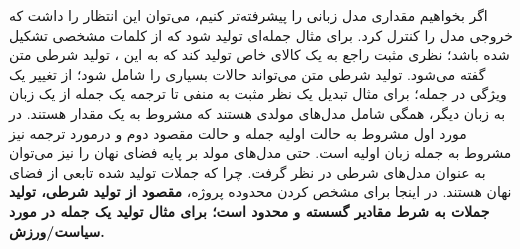 اگر بخواهیم مقداری \task{} مدل زبانی را پیشرفته‌تر کنیم، می‌توان این انتظار را داشت که خروجی مدل را کنترل کرد. برای مثال جمله‌ای تولید شود که از کلمات مشخصی تشکیل شده باشد؛ نظری مثبت راجع به یک کالای خاص تولید کند که به این \task{}، تولید شرطی متن گفته می‌شود. تولید شرطی متن می‌تواند حالات بسیاری را شامل شود؛ از تغییر یک ویژگی در جمله؛ برای مثال تبدیل یک نظر مثبت به منفی تا ترجمه یک جمله از یک زبان به زبان دیگر، همگی شامل مدل‌های مولدی هستند که مشروط به یک مقدار هستند. در مورد اول مشروط به حالت اولیه جمله و حالت مقصود دوم و درمورد ترجمه نیز مشروط به جمله زبان اولیه است. حتی مدل‌های  مولد بر پایه فضای نهان را نیز می‌توان به عنوان مدل‌های شرطی در نظر گرفت. چرا که جملات تولید شده تابعی از فضای نهان هستند. در اینجا برای مشخص کردن محدوده پروژه، 
{\bf
    مقصود از تولید شرطی، تولید جملات به شرط مقادیر گسسته و محدود است؛ برای مثال تولید یک جمله در مورد سیاست/ورزش.}
